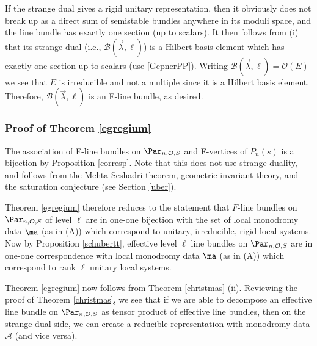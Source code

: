 If the strange dual gives a rigid unitary representation, then it obviously does not break up as a direct sum of semistable bundles anywhere in its moduli space, and the line bundle has exactly one section (up to scalars). It then follows from (i) that its  strange dual (i.e., $\mathcal{B}(\vec{\lambda},\ell)$) is a Hilbert basis element which has exactly one section up to scalars (use \eqref{GepnerPP}). Writing $\mathcal{B}(\vec{\lambda},\ell)=\mathcal{O}(E)$ we see that $E$ is irreducible and not a multiple since it is a Hilbert basis element. Therefore, $\mathcal{B}(\vec{\lambda},\ell)$ is an F-line bundle, as desired.
\subsubsection{Proof of Theorem \ref{egregium}}
The association of F-line bundles on $\Par_{n,\mathcal{O},S}$ and F-vertices of $P_n(s)$ is a bijection by Proposition \ref{corresp}. Note that this does not use
strange duality, and follows from the Mehta-Seshadri theorem, geometric invariant theory, and the saturation conjecture (see Section \ref{uber}).

Theorem \ref{egregium}  therefore reduces to the statement  that $F$-line bundles on $\Par_{n,\mathcal{O},S}$ of level $\ell$ are in one-one bijection with the set of local monodromy data $\ma$ (as in (A)) which correspond to unitary, irreducible, rigid local systems. Now  by Proposition \ref{schubertt}, effective level $\ell$  line bundles on $\Par_{n,\mathcal{O},S}$ are in one-one correspondence with local monodromy data $\ma$ (as in (A)) which correspond to  rank $\ell$ unitary local systems.


Theorem \ref{egregium} now follows from Theorem \ref{christmas} (ii). Reviewing the proof of Theorem \ref{christmas}, we see that if we are able to
decompose an effective  line bundle on $\Par_{n,\mathcal{O},S}$ as tensor product of effective line bundles, then on the strange dual side, we can create a reducible representation with monodromy data $\mathcal{A}$ (and vice versa).


